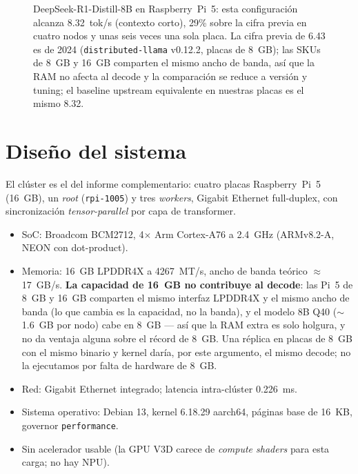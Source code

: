 \documentclass[10pt,a4paper]{article}
\begin{document}
\begin{figure}[H]
\centering
{}
\caption{DeepSeek-R1-Distill-8B en Raspberry~Pi~5: esta configuración alcanza 8.32~tok/s (contexto corto), 29\% sobre la cifra previa en cuatro nodos y unas seis veces una sola placa. La cifra previa de 6.43 es de 2024 (\texttt{distributed-llama} v0.12.2, placas de 8~GB); las SKUs de 8~GB y 16~GB comparten el mismo ancho de banda, así que la RAM no afecta al decode y la comparación se reduce a versión y tuning; el baseline upstream equivalente en nuestras placas es el mismo 8.32.}
\label{fig:records}
\end{figure}

\section{Diseño del sistema}
El clúster es el del informe complementario: cuatro placas Raspberry~Pi~5 (16~GB), un \emph{root} (\texttt{rpi-1005}) y tres \emph{workers}, Gigabit Ethernet full-duplex, con sincronización \emph{tensor-parallel} por capa de transformer.
\begin{itemize}
  \item SoC: Broadcom BCM2712, 4$\times$ Arm Cortex-A76 a 2.4~GHz (ARMv8.2-A, NEON con dot-product).
  \item Memoria: 16~GB LPDDR4X a 4267~MT/s, ancho de banda teórico $\approx$17~GB/s. \textbf{La capacidad de 16~GB no contribuye al decode}: las Pi~5 de 8~GB y 16~GB comparten el mismo interfaz LPDDR4X y el mismo ancho de banda (lo que cambia es la capacidad, no la banda), y el modelo 8B Q40 ($\sim$1.6~GB por nodo) cabe en 8~GB --- así que la RAM extra es solo holgura, y no da ventaja alguna sobre el récord de 8~GB. Una réplica en placas de 8~GB con el mismo binario y kernel daría, por este argumento, el mismo decode; no la ejecutamos por falta de hardware de 8~GB.
  \item Red: Gigabit Ethernet integrado; latencia intra-clúster 0.226~ms.
  \item Sistema operativo: Debian 13, kernel 6.18.29 aarch64, páginas base de 16~KB, governor \texttt{performance}.
  \item Sin acelerador usable (la GPU V3D carece de \emph{compute shaders} para esta carga; no hay NPU).
\end{itemize}
\end{document}
